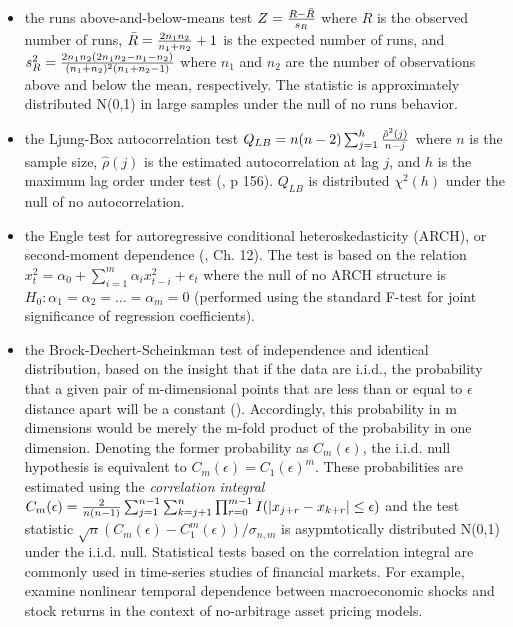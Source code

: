 \documentclass[12pt]{amsart}
\begin{document}
\begin{itemize}

\item the runs above-and-below-means test $Z = {{R-\bar R} \over {s_R}}$ where $R$ is the observed number of runs, $\bar R = {{2n_1n_2} \over {n_1+n_2}} +1$ is the expected number of runs, and $s^2_R = {{2n_1n_2 (2n_1n_2-n_1-n_2)} \over {(n_1+n_2)^2 (n_1+n_2-1)}} $ where $n_1$ and $n_2$ are the number of observations above and below the mean, respectively. The statistic is approximately distributed N(0,1) in large samples under the null of no runs behavior.
\item the Ljung-Box autocorrelation test $Q_{LB} = n(n-2) \sum_{j=1} ^h {{\hat{\rho}^2(j)} \over {n-j}}$ where $n$ is the sample size, $\hat{\rho}(j)$ is the estimated autocorrelation at lag $j$, and $h$ is the maximum lag order under test (\cite{Harvey1986}, p 156). $Q_{LB}$ is distributed $\chi^2(h)$ under the null of no autocorrelation.
\item the Engle test for autoregressive conditional heteroskedasticity (ARCH), or second-moment dependence (\cite{Hamilton1994}, Ch. 12). The test is based on the relation $x_t^2 = \alpha_0 + \sum_{i=1} ^m \alpha_i x_{t-i}^2 + \epsilon_t$ where the null of no ARCH structure is $H_0: \alpha_1 = \alpha_2  = \ldots = \alpha_m = 0$ (performed using the standard F-test for joint significance of regression coefficients). 
\item the Brock-Dechert-Scheinkman test of independence and identical distribution, based on the insight that if the data are i.i.d., the probability that a given pair of m-dimensional points that are less than or equal to $\epsilon$ distance apart will be a constant (\cite{BaumHurnLindsay}). Accordingly, this probability in m dimensions would be merely the m-fold product of the probability in one dimension. Denoting the former probability as $C_m(\epsilon)$, the i.i.d. null hypothesis is equivalent to  $C_m(\epsilon) = C_1(\epsilon)^m$.  These probabilities are estimated using the \emph{correlation integral}  $C_m(\epsilon) = {{2} \over {n(n-1) }} \sum_{j=1}^{n-1}\sum_{k=j+1}^{n}\prod_{r=0}^{m-1} I(|x_{j+r} - x_{k+r}|  \le \epsilon) $ and the test statistic $\sqrt{n} (C_m(\epsilon)-C_1^m(\epsilon))/\sigma_{n,m}$ is asypmtotically distributed N(0,1) under the i.i.d. null. Statistical tests based on the correlation integral are commonly used in time-series studies of financial markets. For example, \cite{KramerHiemstra} examine nonlinear temporal dependence between macroeconomic shocks and stock returns in the context of no-arbitrage asset pricing models.  

\end{itemize}
\end{document}
